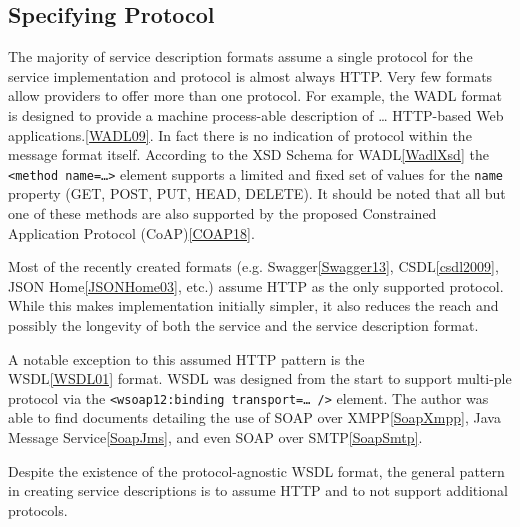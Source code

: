 \documentclass{wsrest2014}
\begin{document}
\subsection{Specifying Protocol}
\label{_specifying_protocol}
 \par{}The majority of service description formats assume a single protocol for the service implementation and protocol is almost always HTTP. Very few formats allow providers to offer more than one protocol. For example, the WADL format \textquotedbl{}is designed to provide a machine process-able description of \dots{} HTTP-based Web applications.\textquotedbl{}\hyperlink{WADL09}{[WADL09]}. In fact there is no indication of protocol within the message format itself. According to the XSD Schema for WADL\hyperlink{WadlXsd}{[WadlXsd]} the \texttt{\textless{}method name=\textquotedbl{}\dots{}\textquotedbl{}\textgreater{}} element supports a limited and fixed set of values for the \texttt{name} property (GET, POST, PUT, HEAD, DELETE). It should be noted that all but one of these methods are also supported by the proposed Constrained Application Protocol (CoAP)\hyperlink{COAP18}{[COAP18]}.
 \par{}Most of the recently created formats (e.g. Swagger\hyperlink{Swagger13}{[Swagger13]}, CSDL\hyperlink{csdl2009}{[csdl2009]}, JSON Home\hyperlink{JSONHome03}{[JSONHome03]}, etc.) assume HTTP as the only supported protocol. While this makes implementation initially simpler, it also reduces the reach and possibly the longevity of both the service and the service description format.
 \par{}A notable exception to this \textquotedbl{}assumed HTTP\textquotedbl{} pattern is the \\WSDL\hyperlink{WSDL01}{[WSDL01]} format. WSDL was designed from the start to support multi-ple protocol via the \texttt{\textless{}wsoap12:binding transport=\textquotedbl{}\dots{}\textquotedbl{} /\textgreater{}} element. The author was able to find documents detailing the use of SOAP over XMPP\hyperlink{SoapXmpp}{[SoapXmpp]}, Java Message Service\hyperlink{SoapJms}{[SoapJms]}, and even SOAP over SMTP\hyperlink{SoapSmtp}{[SoapSmtp]}.
 \par{}Despite the existence of the protocol-agnostic WSDL format, the general pattern in creating service descriptions is to assume HTTP and to not support additional protocols.
\hypertarget{_constraining_media_types}{}
\end{document}

